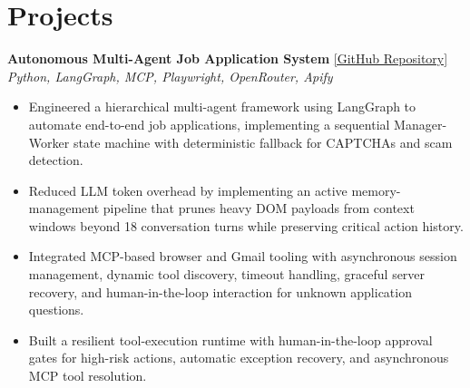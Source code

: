 \documentclass[10pt, letterpaper]{article}
\begin{document}
\section{Projects}
\textbf{Autonomous Multi-Agent Job Application System} \hfill \href{https://github.com/Jaswanth19-596/Autonomous_Multi_Agent_Job_Application_System}{[GitHub Repository]} \\
\textit{Python, LangGraph, MCP, Playwright, OpenRouter, Apify}
\begin{itemize}
    \item Engineered a hierarchical multi-agent framework using LangGraph to automate end-to-end job applications, implementing a sequential Manager-Worker state machine with deterministic fallback for CAPTCHAs and scam detection.
    \item Reduced LLM token overhead by implementing an active memory-management pipeline that prunes heavy DOM payloads from context windows beyond 18 conversation turns while preserving critical action history.
    \item Integrated MCP-based browser and Gmail tooling with asynchronous session management, dynamic tool discovery, timeout handling, graceful server recovery, and human-in-the-loop interaction for unknown application questions.
    \item Built a resilient tool-execution runtime with human-in-the-loop approval gates for high-risk actions, automatic exception recovery, and asynchronous MCP tool resolution.
\end{itemize}
\end{document}
